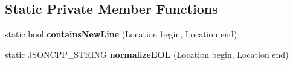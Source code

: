 \subsection*{Static Private Member Functions}
\begin{DoxyCompactItemize}
\item 
\mbox{\label{classJson_1_1Reader_af7c00522afb8dc66df99e7629e0a5a08}} 
static bool {\bfseries contains\+New\+Line} (Location begin, Location end)
\item 
\mbox{\label{classJson_1_1Reader_a530cd69da12826a7c6618e8640284dcf}} 
static J\+S\+O\+N\+C\+P\+P\+\_\+\+S\+T\+R\+I\+NG {\bfseries normalize\+E\+OL} (Location begin, Location end)
\end{DoxyCompactItemize}
